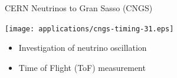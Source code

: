 \documentclass[compress,red]{beamer}
\begin{document}
\begin{frame}{CERN Neutrinos to Gran Sasso (CNGS)}

    \begin{center}
      \texttt{[image: applications/cngs-timing-31.eps]}
    \end{center}

    \begin{center}
      \begin{itemize}
	\item Investigation of neutrino oscillation
	\item Time of Flight (ToF) measurement
      \end{itemize}

    \end{center}


\end{frame}
% 
% 
% 
\end{document}
